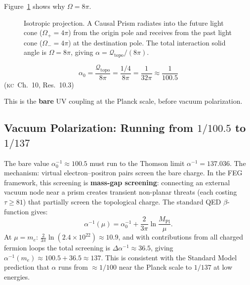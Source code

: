 \documentclass[11pt, a4paper, openany]{book}
\newcommand{\MPl}{M_{\mathrm{Pl}}}
\newcommand{\KC}[1]{\textnormal{(\textsc{kc}~#1)}}
\newcounter{thm}[chapter]
\begin{document}
\noindent
Figure~\ref{fig:isotropic-projection} shows why $\Omega = 8\pi$.

\begin{figure}[ht]
\centering
{}
\caption{Isotropic projection.  A Causal Prism radiates into the
future light cone ($\Omega_+ = 4\pi$) from the origin pole and receives
from the past light cone ($\Omega_- = 4\pi$) at the destination pole.
The total interaction solid angle is $\Omega = 8\pi$, giving
$\alpha = \mathcal{Q}_{\mathrm{topo}}/(8\pi)$.}
\label{fig:isotropic-projection}
\end{figure}

\begin{theorem}\label{thm:alpha}
\[
  \boxed{\;\alpha_0 = \frac{\mathcal{Q}_{\mathrm{topo}}}{8\pi}
  = \frac{1/4}{8\pi} = \frac{1}{32\pi}
  \approx \frac{1}{100.5}\;}
\]
\KC{Ch.~10, Res.~10.3}
\end{theorem}

\noindent
This is the \textbf{bare} UV coupling at the Planck scale, before vacuum
polarization.

\subsection{Vacuum Polarization: Running from $1/100.5$ to $1/137$}

The bare value $\alpha_0^{-1} \approx 100.5$ must run to the Thomson
limit $\alpha^{-1} = 137.036$. The mechanism: virtual electron--positron
pairs screen the bare charge. In the FEG framework, this screening is
\textbf{mass-gap screening}: connecting an external vacuum node near
a prism creates transient non-planar threats (each costing $\tau \geq 81$)
that partially screen the topological charge. The standard QED $\beta$-function gives:
\[
  \alpha^{-1}(\mu) = \alpha_0^{-1}
  + \frac{2}{3\pi}\ln\frac{\MPl}{\mu}.
\]
At $\mu = m_e$: $\frac{2}{3\pi}\ln(2.4 \times 10^{22}) \approx 10.9$,
and with contributions from all charged fermion loops the total
screening is $\Delta\alpha^{-1} \approx 36.5$, giving
$\alpha^{-1}(m_e) \approx 100.5 + 36.5 \approx 137$. This is
consistent with the Standard Model prediction that $\alpha$ runs from
$\approx 1/100$ near the Planck scale to $1/137$ at low energies.
\end{document}
